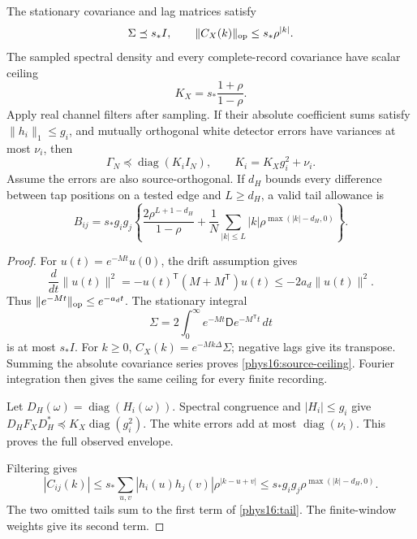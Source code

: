 \begin{proposition}
\label{phys16:envelopes}
The stationary covariance and lag matrices satisfy
\begin{equation}
 \Sigma\preceq s_*I,
 \qquad \|C_X(k)\|_{\rm op}\le s_*\rho^{|k|}.
 \label{phys16:lag-decay}
\end{equation}
The sampled spectral density and every complete-record covariance have scalar ceiling
\begin{equation}
 K_X=s_*\frac{1+\rho}{1-\rho}.
 \label{phys16:source-ceiling}
\end{equation}
Apply real channel filters after sampling. If their absolute coefficient sums satisfy $\|h_i\|_1\le g_i$, and mutually orthogonal white detector errors have variances at most $\nu_i$, then
\begin{equation}
 \Gamma_N\preceq\operatorname{diag}(K_iI_N),
 \qquad K_i=K_Xg_i^2+\nu_i.
 \label{phys16:observed-ceiling}
\end{equation}
Assume the errors are also source-orthogonal. If $d_H$ bounds every difference between tap positions on a tested edge and $L\ge d_H$, a valid tail allowance is
\begin{equation}
 B_{ij}=s_*g_ig_j\left\{
 \frac{2\rho^{L+1-d_H}}{1-\rho}
 +\frac1N\sum_{|k|\le L}|k|\rho^{\max(|k|-d_H,0)}\right\}.
 \label{phys16:tail}
\end{equation}
\end{proposition}
\begin{proof}
For $u(t)=e^{-Mt}u(0)$, the drift assumption gives
\[
 \frac{d}{dt}\|u(t)\|^2
 =-u(t)^{\mathsf T}(M+M^{\mathsf T})u(t)
 \le-2a_d\|u(t)\|^2.
\]
Thus $\|e^{-Mt}\|_{\rm op}\le e^{-a_dt}$. The stationary integral
\[
 \Sigma=2\int_0^\infty e^{-Mt}\mathsf D e^{-M^{\mathsf T}t}\,dt
\]
is at most $s_*I$. For $k\ge0$, $C_X(k)=e^{-Mk\Delta}\Sigma$; negative lags give its transpose. Summing the absolute covariance series proves \eqref{phys16:source-ceiling}. Fourier integration then gives the same ceiling for every finite recording.

Let $D_H(\omega)=\operatorname{diag}(H_i(\omega))$. Spectral congruence and $|H_i|\le g_i$ give
$D_HF_XD_H^*\preceq K_X\operatorname{diag}(g_i^2)$. The white errors add at most $\operatorname{diag}(\nu_i)$. This proves the full observed envelope.

Filtering gives
\[
 |C_{ij}(k)|
 \le s_*\sum_{u,v}|h_i(u)h_j(v)|\rho^{|k-u+v|}
 \le s_*g_ig_j\rho^{\max(|k|-d_H,0)}.
\]
The two omitted tails sum to the first term of \eqref{phys16:tail}. The finite-window weights give its second term.
\end{proof}

